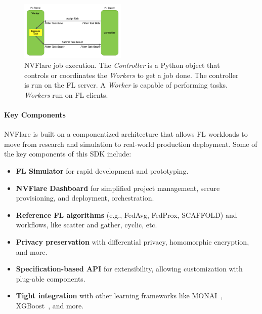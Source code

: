 \documentclass[11pt]{article}
\begin{document}
\begin{figure}[htbp]
    \centering
    \includegraphics[width=0.45\textwidth]{fig/controller_worker_flow.png}
    \caption{NVFlare job execution. The \textit{Controller} is a Python object that controls or coordinates the \textit{Workers} to get a job done. The controller is run on the FL server. A \textit{Worker} is capable of performing tasks. \textit{Workers} run on FL clients. \label{fig:job}}
\end{figure}

\paragraph{Key Components}
NVFlare is built on a componentized architecture that allows FL workloads to move from research and simulation to real-world production deployment. Some of the key components of this SDK include:

\begin{itemize}%
    \item \textbf{FL Simulator} for rapid development and prototyping.
    \item \textbf{NVFlare Dashboard} for simplified project management, secure provisioning, and deployment, orchestration.
    \item \textbf{Reference FL algorithms} (e.g., FedAvg, FedProx, SCAFFOLD) and workflows, like scatter and gather, cyclic, etc.
    \item \textbf{Privacy preservation} with differential privacy, homomorphic encryption, and more.
    \item \textbf{Specification-based API} for extensibility, allowing customization with plug-able components.
    \item \textbf{Tight integration} with other learning frameworks like MONAI~\cite{cardoso2022monai}, XGBoost~\cite{Chen:2016:XST:2939672.2939785}, and more.    
\end{itemize}
\end{document}

